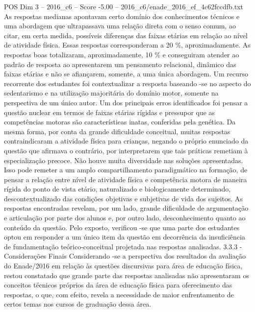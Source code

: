 \begin{textsample}{POS Dim 3 – 2016\_c6 – Score -5.00 – 2016\_c6/enade\_2016\_ef\_4c62fccdfb.txt}
As respostas medianas apontavam certo domínio dos conhecimentos técnicos e uma abordagem que ultrapassava uma relação direta com o senso comum, ao citar, em certa medida, possíveis diferenças das faixas etárias em relação ao nível de atividade física.
Essas respostas corresponderam a 20 \%, aproximadamente.
As respostas boas totalizaram, aproximadamente, 10 \% e conseguiram atender ao padrão de resposta ao apresentarem um pensamento relacional, dinâmico das faixas etárias e não se afiançarem, somente, a uma única abordagem.
Um recurso recorrente dos estudantes foi contextualizar a resposta baseando -se no aspecto do sedentarismo e na utilização majoritária do domínio motor, somente na perspectiva de um único autor.
Um dos principais erros identificados foi pensar a questão nuclear em termos de faixas etárias rígidas e pressupor que as competências motoras são características inatas, conferidas pela genética.
Da mesma forma, por conta da grande dificuldade conceitual, muitas respostas contraindicaram a atividade física para crianças, negando o próprio enunciado da questão que afirmava o contrário, por interpretarem que tais práticas remetiam à especialização precoce.
Não houve muita diversidade nas soluções apresentadas.
Isso pode remeter a um amplo compartilhamento paradigmático na formação, de pensar a relação entre nível de atividade física e competência motora de maneira rígida do ponto de vista etário, naturalizado e biologicamente determinado, descontextualizado das condições objetivas e subjetivas de vida dos sujeitos.
As respostas encontradas revelam, por um lado, grande dificuldade de argumentação e articulação por parte dos alunos e, por outro lado, desconhecimento quanto ao conteúdo da questão.
Pelo exposto, verificou -se que uma parte dos estudantes optou em responder a um único item da questão em decorrência da insuficiência de fundamentação teórico-conceitual projetada nas respostas analisadas. 3.3.3 - Considerações Finais Considerando -se a perspectiva dos resultados da avaliação do Enade/2016 em relação às questões discursivas para área de educação física, restou constatado que grande parte das respostas analisadas não apresentaram os conceitos técnicos próprios da área de educação física para oferecimento das respostas, o que, com efeito, revela a necessidade de maior enfrentamento de certos temas nos cursos de graduação dessa área.

\end{textsample}
